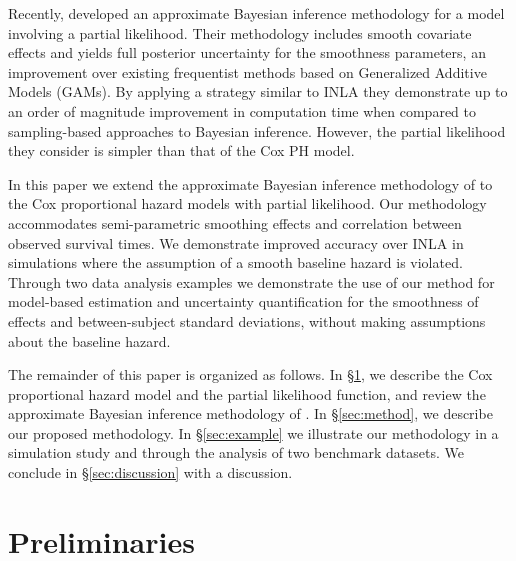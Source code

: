 \documentclass[]{article}
\begin{document}
Recently, \citet{casecross} developed an approximate Bayesian inference methodology for a model involving a partial likelihood. Their methodology includes smooth covariate effects and yields full posterior uncertainty for the smoothness parameters, an improvement over existing frequentist methods based on Generalized Additive Models (GAMs). By applying a strategy similar to INLA they demonstrate up to an order of magnitude improvement in computation time when compared to sampling-based approaches to Bayesian inference. However, the partial likelihood they consider is simpler than that of the Cox PH model.

In this paper we extend the approximate Bayesian inference methodology of \citet{casecross} to the Cox proportional hazard models with partial likelihood. Our methodology accommodates semi-parametric smoothing effects and correlation between observed survival times. We demonstrate improved accuracy over INLA in simulations where the assumption of a smooth baseline hazard is violated. Through two data analysis examples we demonstrate the use of our method for model-based estimation and uncertainty quantification for the smoothness of effects and between-subject standard deviations, without making assumptions about the baseline hazard.

The remainder of this paper is organized as follows. In \S\ref{sec:prelim}, we describe the Cox proportional hazard model and the partial likelihood function, and review the approximate Bayesian inference methodology of \citet{casecross}. In \S\ref{sec:method}, we describe our proposed methodology. In \S\ref{sec:example} we illustrate our methodology in a simulation study and through the analysis of two benchmark datasets. We conclude in \S\ref{sec:discussion} with a discussion.



\section{Preliminaries}\label{sec:prelim}
\end{document}
